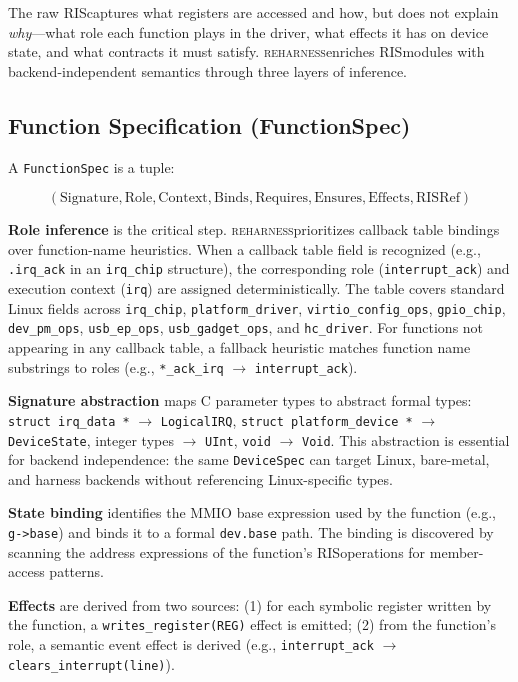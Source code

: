 \documentclass[sigplan, screen, review, anonymous]{acmart}
\newcommand{\reharness}{\textsc{reharness}}
\newcommand{\rislang}{RIS}
\begin{document}
The raw \rislang captures what registers are accessed and how, but does not explain \emph{why}---what role each function plays in the driver, what effects it has on device state, and what contracts it must satisfy. \reharness enriches \rislang modules with backend-independent semantics through three layers of inference.

\subsection{Function Specification (FunctionSpec)}

A \texttt{FunctionSpec} is a tuple:

\[
(\text{Signature}, \text{Role}, \text{Context}, \text{Binds}, \text{Requires}, \text{Ensures}, \text{Effects}, \text{RISRef})
\]

\textbf{Role inference} is the critical step. \reharness prioritizes callback table bindings over function-name heuristics. When a callback table field is recognized (e.g., \texttt{.irq\_ack} in an \texttt{irq\_chip} structure), the corresponding role (\texttt{interrupt\_ack}) and execution context (\texttt{irq}) are assigned deterministically. The table covers standard Linux fields across \texttt{irq\_chip}, \texttt{platform\_driver}, \texttt{virtio\_config\_ops}, \texttt{gpio\_chip}, \texttt{dev\_pm\_ops}, \texttt{usb\_ep\_ops}, \texttt{usb\_gadget\_ops}, and \texttt{hc\_driver}. For functions not appearing in any callback table, a fallback heuristic matches function name substrings to roles (e.g., \texttt{*\_ack\_irq} $\rightarrow$ \texttt{interrupt\_ack}).

\textbf{Signature abstraction} maps C parameter types to abstract formal types: \texttt{struct irq\_data *} $\rightarrow$ \texttt{LogicalIRQ}, \texttt{struct platform\_device *} $\rightarrow$ \texttt{DeviceState}, integer types $\rightarrow$ \texttt{UInt}, \texttt{void} $\rightarrow$ \texttt{Void}. This abstraction is essential for backend independence: the same \texttt{DeviceSpec} can target Linux, bare-metal, and harness backends without referencing Linux-specific types.

\textbf{State binding} identifies the MMIO base expression used by the function (e.g., \texttt{g->base}) and binds it to a formal \texttt{dev.base} path. The binding is discovered by scanning the address expressions of the function's \rislang operations for member-access patterns.

\textbf{Effects} are derived from two sources: (1) for each symbolic register written by the function, a \texttt{writes\_register(REG)} effect is emitted; (2) from the function's role, a semantic event effect is derived (e.g., \texttt{interrupt\_ack} $\rightarrow$ \texttt{clears\_interrupt(line)}).
\end{document}
